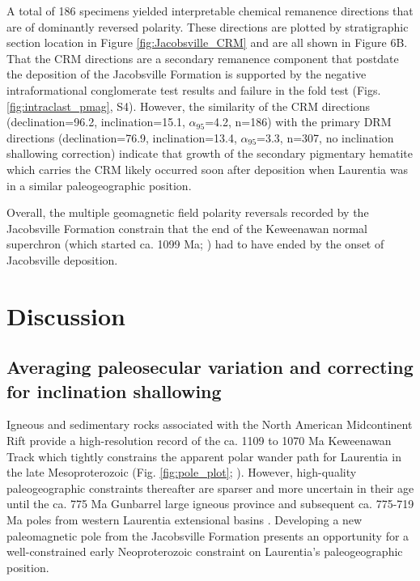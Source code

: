 A total of 186 specimens yielded interpretable chemical remanence directions that are of dominantly reversed polarity. These directions are plotted by stratigraphic section location in Figure \ref{fig:Jacobsville_CRM} and are all shown in Figure 6B. That the CRM directions are a secondary remanence component that postdate the deposition of the Jacobsville Formation is supported by the negative intraformational conglomerate test results and failure in the fold test (Figs. \ref{fig:intraclast_pmag}, S4). However, the similarity of the CRM directions (declination=96.2\textdegree, inclination=15.1\textdegree, $\alpha_{95}$=4.2\textdegree, n=186) with the primary DRM directions (declination=76.9\textdegree, inclination=13.4\textdegree, $\alpha_{95}$=3.3\textdegree, n=307, no inclination shallowing correction) indicate that growth of the secondary pigmentary hematite which carries the CRM likely occurred soon after deposition when Laurentia was in a similar paleogeographic position. 

Overall, the multiple geomagnetic field polarity reversals recorded by the Jacobsville Formation constrain that the end of the Keweenawan normal superchron \citep{Driscoll2016b} (which started ca. 1099 Ma; \citealp{Swanson-Hysell2019a}) had to have ended by the onset of Jacobsville deposition.
 
\section*{Discussion}
\subsection*{Averaging paleosecular variation and correcting for inclination shallowing}

Igneous and sedimentary rocks associated with the North American Midcontinent Rift provide a high-resolution record of the ca. 1109 to 1070 Ma Keweenawan Track which tightly constrains the apparent polar wander path for Laurentia in the late Mesoproterozoic (Fig. \ref{fig:pole_plot}; \citealp{Swanson-Hysell2019a}). However, high-quality paleogeographic constraints thereafter are sparser and more uncertain in their age until the ca. 775 Ma Gunbarrel large igneous province \citep{Harlan2003a} and subsequent ca. 775-719 Ma poles from western Laurentia extensional basins \citep{Weil2006a, Eyster2019a}. Developing a new paleomagnetic pole from the Jacobsville Formation presents an opportunity for a well-constrained early Neoproterozoic constraint on Laurentia's paleogeographic position. 


